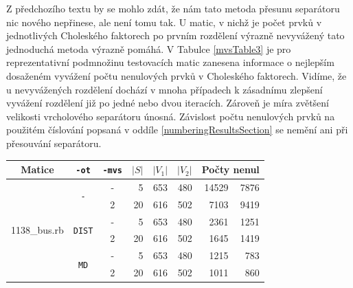 \documentclass[11pt,american,czech,oneside]{book}
\theoremstyle{plain}
\theoremstyle{definition}
\begin{document}
Z předchozího textu by se mohlo zdát, že nám tato metoda přesunu separátoru nic nového nepřinese, ale není tomu tak. U matic, v nichž je počet prvků v jednotlivých Choleského faktorech po prvním rozdělení výrazně nevyvážený tato jednoduchá metoda výrazně pomáhá. V Tabulce \ref{mvsTable3} je pro reprezentativní podmnožinu testovacích matic zanesena informace o nejlepším dosaženém vyvážení počtu nenulových prvků v Choleského faktorech. Vidíme, že u nevyvážených rozdělení dochází v mnoha případech k zásadnímu zlepšení vyvážení rozdělení již po jedné nebo dvou iteracích. Zároveň je míra zvětšení velikosti vrcholového separátoru únosná. Závislost počtu nenulových prvků na použitém číslování popsaná v oddíle \ref{numberingResultsSection} se nemění ani při přesouvání separátoru.

\bigskip
{\noindent
  \footnotesize
  \centering
  \renewcommand{\arraystretch}{1.1}
\begin{tabular}{|l|c|c|r|r|r|r|r|}
  \hline
  \multicolumn{1}{|c|}{Matice} & \multicolumn{1}{|c|}{\texttt{-ot}}  &\multicolumn{1}{|c|}{\texttt{-mvs}} &\multicolumn{1}{|c|}{$|S|$} & \multicolumn{1}{|c|}{$|V_1|$}& \multicolumn{1}{|c|}{$|V_2|$} & \multicolumn{2}{c|}{Počty nenul} \\
	\hline
	\multirow{8}{*}{1138\_bus.rb}
	& \multirow{2}{*}{\texttt{-}}
  	& -	& 5	  & 653 & 480 & 14529	&	7876	\\
	& & 2	&	20	&	616	&	502	&	7103	&	9419	\\

  & \multirow{2}{*}{\texttt{DIST}}
  	& -	& 5	  & 653 & 480 &	2361	&	1251	\\
	& & 2	&	20	&	616	&	502	&	1645	&	1419	\\

  & \multirow{2}{*}{\texttt{MD}}
	  & -	& 5	  & 653 & 480 &	1215	&	783 \\
	& & 2	&	20	&	616	&	502	&	1011	&	860	\\


\end{tabular}}
\end{document}
